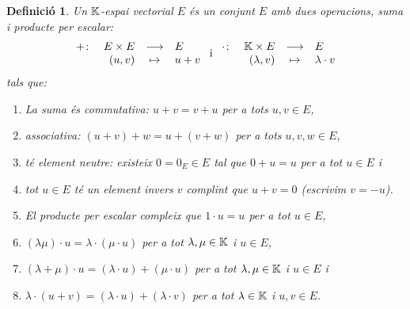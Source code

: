 \documentclass[
  11pt,
]{book}
\numberwithin{dummy}{section}
\theoremstyle{maincolornumbox}
\theoremstyle{blacknumex}
\theoremstyle{blacknumbox}
\newtheorem{definitionT}{Definició}[chapter]
\theoremstyle{maincolornum}
\newenvironment{definition}{\begin{dBox}\begin{definitionT}}{\end{definitionT}\end{dBox}}
\newlength\esp
\begin{document}
\begin{definition}

Un \emph{\(\mathbb{K}\)-espai vectorial \(E\)} és un conjunt \(E\) amb dues operacions,
suma i producte per escalar: \[\begin{array}{rrcl}
    +\colon & E\times E & \longrightarrow & E \\
    & (u,v) & \mapsto & u+v 
    \end{array}
    \text{ i }
    \begin{array}{rrcl}
    \cdot\colon & \mathbb{K}\times E & \longrightarrow & E \\
    & (\lambda,v) & \mapsto & \lambda \cdot v 
    \end{array}\] tals que:

\begin{enumerate}
\def\labelenumi{\arabic{enumi}.}
\item
  La suma és commutativa: \(u+v=v+u\) per a tots \(u,v\in E\),
\item
  associativa: \((u+v)+w=u+(v+w)\) per a tots \(u,v,w \in E\),
\item
  té element neutre: existeix \(0=0_E\in E\) tal que \(0+u=u\) per a tot
  \(u\in E\) i
\item
  tot \(u\in E\) té un element invers \(v\) complint que \(u+v=0\) (escrivim
  \(v=-u\)).
\item
  El producte per escalar compleix que \(1\cdot u=u\) per a tot
  \(u\in E\),
\item
  \((\lambda \mu)\cdot u=\lambda \cdot(\mu\cdot u)\) per a tot
  \(\lambda, \mu \in \mathbb{K}\) i \(u\in E\),
\item
  \((\lambda + \mu)\cdot u=(\lambda \cdot u) + (\mu\cdot u)\) per a tot
  \(\lambda, \mu \in \mathbb{K}\) i \(u\in E\) i
\item
  \(\lambda\cdot (u+v)=(\lambda \cdot u) + (\lambda\cdot v)\) per a tot
  \(\lambda \in \mathbb{K}\) i \(u,v\in E\).
\end{enumerate}

\end{definition}
\end{document}
